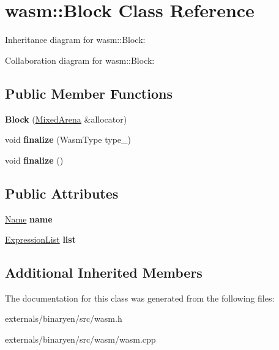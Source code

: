 \hypertarget{classwasm_1_1_block}{}\section{wasm\+:\+:Block Class Reference}
\label{classwasm_1_1_block}


Inheritance diagram for wasm\+:\+:Block\+:


Collaboration diagram for wasm\+:\+:Block\+:
\subsection*{Public Member Functions}
\begin{DoxyCompactItemize}
\item 
\mbox{\label{classwasm_1_1_block_acf8997a9bed332bfe201fd62344aea11}} 
{\bfseries Block} (\mbox{\hyperlink{struct_mixed_arena}{Mixed\+Arena}} \&allocator)
\item 
\mbox{\label{classwasm_1_1_block_a2c09759a891ee67b088c0fc20c6a3691}} 
void {\bfseries finalize} (Wasm\+Type type\+\_\+)
\item 
\mbox{\label{classwasm_1_1_block_a193faf91f4e64689e615c96017f12f0b}} 
void {\bfseries finalize} ()
\end{DoxyCompactItemize}
\subsection*{Public Attributes}
\begin{DoxyCompactItemize}
\item 
\mbox{\label{classwasm_1_1_block_ae57a526da68c34706a529c7ef02647b8}} 
\mbox{\hyperlink{structwasm_1_1_name}{Name}} {\bfseries name}
\item 
\mbox{\label{classwasm_1_1_block_add0d7b15a78d920402c79f37dbd61e4c}} 
\mbox{\hyperlink{class_arena_vector}{Expression\+List}} {\bfseries list}
\end{DoxyCompactItemize}
\subsection*{Additional Inherited Members}


The documentation for this class was generated from the following files\+:\begin{DoxyCompactItemize}
\item 
externals/binaryen/src/wasm.\+h\item 
externals/binaryen/src/wasm/wasm.\+cpp\end{DoxyCompactItemize}
